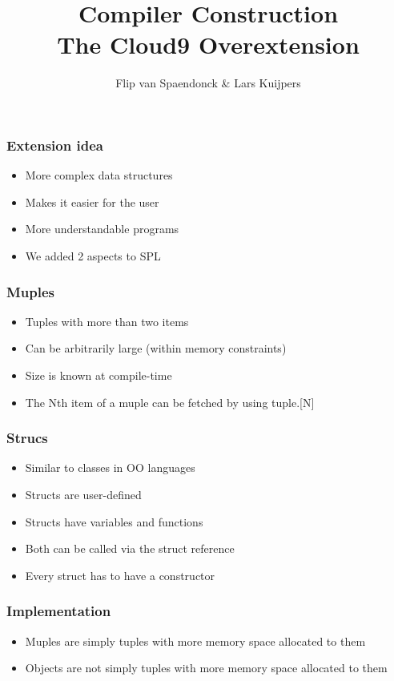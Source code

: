 \documentclass{beamer}
\author[Flip \& Lars]{Flip van Spaendonck \& Lars Kuijpers}
\title{Compiler Construction \\ The Cloud9 Overextension }
\begin{document}
\begin{frame}
\titlepage
\end{frame}

\begin{frame}
\frametitle{Extension idea}
\begin{itemize}
\item More complex data structures
\item Makes it easier for the user
\item More understandable programs
\item We added 2 aspects to SPL
\end{itemize}
\end{frame}

\begin{frame}
\frametitle{Muples}
\begin{itemize}
\item Tuples with more than two items
\item Can be arbitrarily large (within memory constraints)
\item Size is known at compile-time
\item The Nth item of a muple can be fetched by using tuple.[N]
\end{itemize}
\end{frame}

\begin{frame}
\frametitle{Strucs}
\begin{itemize}
\item Similar to classes in OO languages
\item Structs are user-defined
\item Structs have variables and functions
\item Both can be called via the struct reference
\item Every struct has to have a constructor
\end{itemize}
\end{frame}

\begin{frame}
\frametitle{Implementation}
\begin{itemize}
\item Muples are simply tuples with more memory space allocated to them
\item Objects are not simply tuples with more memory space allocated to them
\end{itemize}
\end{frame}
\end{document}
